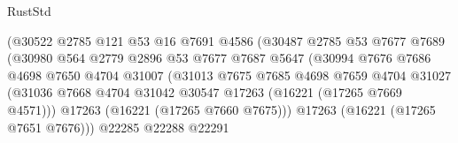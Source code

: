 \begin{lexlean}{RustStd}
\begin{coremodule}
                                        (@30522
                                          @2785
                                          @121
                                          @53
                                          @16
                                          @7691
                                          @4586
                                          (@30487
                                            @2785
                                            @53
                                            @7677
                                            @7689
                                            (@30980
                                              @564
                                              @2779
                                              @2896
                                              @53
                                              @7677
                                              @7687
                                              @5647
                                              (@30994
                                                @7676
                                                @7686
                                                @4698
                                                @7650
                                                @4704
                                                @31007
                                                (@31013
                                                  @7675
                                                  @7685
                                                  @4698
                                                  @7659
                                                  @4704
                                                  @31027
                                                  (@31036
                                                    @7668
                                                    @4704
                                                    @31042
                                                    @30547
                                                    @17263
                                                    (@16221 (@17265 @7669 @4571)))
                                                  @17263
                                                  (@16221 (@17265 @7660 @7675)))
                                                @17263
                                                (@16221 (@17265 @7651 @7676)))
                                              @22285
                                              @22288
                                              @22291

\end{coremodule}
\end{lexlean}
